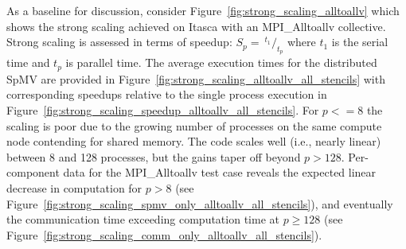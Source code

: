 \documentclass{report}
\begin{document}
As a baseline for discussion, consider Figure~\ref{fig:strong_scaling_alltoallv} which shows the strong scaling achieved on Itasca with an MPI\_Alltoallv collective. Strong scaling is assessed in terms of speedup: $S_p = \ ^{t_1}/_{t_p}$ where $t_1$ is the serial time and $t_p$ is parallel time. The average execution times for the distributed SpMV are provided in Figure~\ref{fig:strong_scaling_alltoallv_all_stencils} with corresponding speedups relative to the single process execution in Figure~\ref{fig:strong_scaling_speedup_alltoallv_all_stencils}. For $p <= 8$ the scaling is poor due to the growing number of processes on the same compute node contending for shared memory. The code scales well (i.e., nearly linear) between 8 and 128 processes, but the gains taper off beyond $p > 128$. Per-component data for the MPI\_Alltoallv test case reveals the expected linear decrease in computation for $p>8$ (see Figure~\ref{fig:strong_scaling_spmv_only_alltoallv_all_stencils}), and eventually the communication time exceeding computation time at $p \geq 128$ (see Figure~\ref{fig:strong_scaling_comm_only_alltoallv_all_stencils}). 
\end{document}
